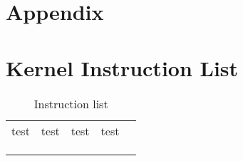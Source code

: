 \section{Appendix}

\appendix
\section{Kernel Instruction List}
\label{sec:KernelInstructionList}

\begin{table}[]
	\centering
	\caption{Instruction list}
	\label{InstructionList}
	\begin{tabular}{lllll}
	test	& test & test & test &  \\
		&  &  &  &  \\
		&  &  &  &  \\
		&  &  &  & 
	\end{tabular}
\end{table}

